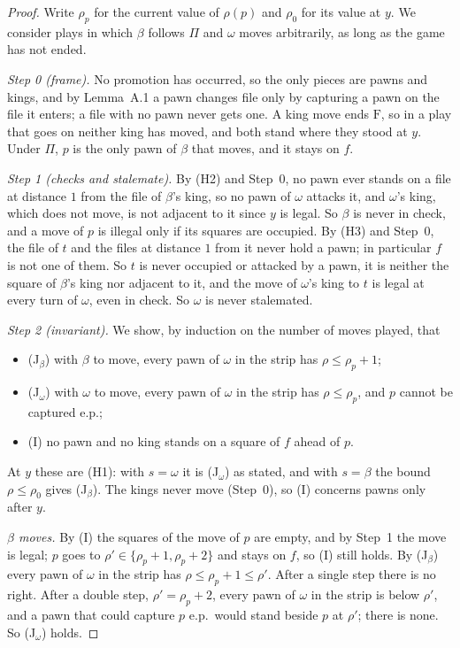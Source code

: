 \begin{proof}
Write $\rho_p$ for the current value of $\rho(p)$ and $\rho_0$ for its value at $y$. We consider plays in which $\beta$
follows $\Pi$ and $\omega$ moves arbitrarily, as long as the game has not ended.

\emph{Step 0 (frame).} No promotion has occurred, so the only pieces are pawns and kings, and by Lemma~A.1 a pawn changes
file only by capturing a pawn on the file it enters; a file with no pawn never gets one. A king move ends $\mathrm{F}$, so
in a play that goes on neither king has moved, and both stand where they stood at $y$. Under $\Pi$, $p$ is the only pawn
of $\beta$ that moves, and it stays on $f$.

\emph{Step 1 (checks and stalemate).} By (H2) and Step~0, no pawn ever stands on a file at distance $1$ from the file
of $\beta$'s king, so no pawn of $\omega$ attacks it, and $\omega$'s king, which does not move, is not adjacent to it
since $y$ is legal. So $\beta$ is never in check, and a move of $p$ is illegal only if its squares are occupied. By (H3)
and Step~0, the file of $t$ and the files at distance $1$ from it never hold a pawn; in particular $f$ is not one of them.
So $t$ is never occupied or attacked by a pawn, it is neither the square of $\beta$'s king nor adjacent to it, and the
move of $\omega$'s king to $t$ is legal at every turn of $\omega$, even in check. So $\omega$ is never stalemated.

\emph{Step 2 (invariant).} We show, by induction on the number of moves played, that
\begin{itemize}
\item[] (J$_\beta$) with $\beta$ to move, every pawn of $\omega$ in the strip has $\rho\le\rho_p+1$;
\item[] (J$_\omega$) with $\omega$ to move, every pawn of $\omega$ in the strip has $\rho\le\rho_p$, and $p$ cannot be
captured e.p.;
\item[] (I) no pawn and no king stands on a square of $f$ ahead of $p$.
\end{itemize}
At $y$ these are (H1): with $s=\omega$ it is (J$_\omega$) as stated, and with $s=\beta$ the bound $\rho\le\rho_0$ gives
(J$_\beta$). The kings never move (Step~0), so (I) concerns pawns only after $y$.

\emph{$\beta$ moves.} By (I) the squares of the move of $p$ are empty, and by Step~1 the move is legal; $p$ goes to
$\rho'\in\{\rho_p+1,\rho_p+2\}$ and stays on $f$, so (I) still holds. By (J$_\beta$) every pawn of $\omega$ in the strip
has $\rho\le\rho_p+1\le\rho'$. After a single step there is no right. After a double step, $\rho'=\rho_p+2$, every pawn
of $\omega$ in the strip is below $\rho'$, and a pawn that could capture $p$ e.p.\ would stand beside $p$ at $\rho'$; there
is none. So (J$_\omega$) holds.


\end{proof}
